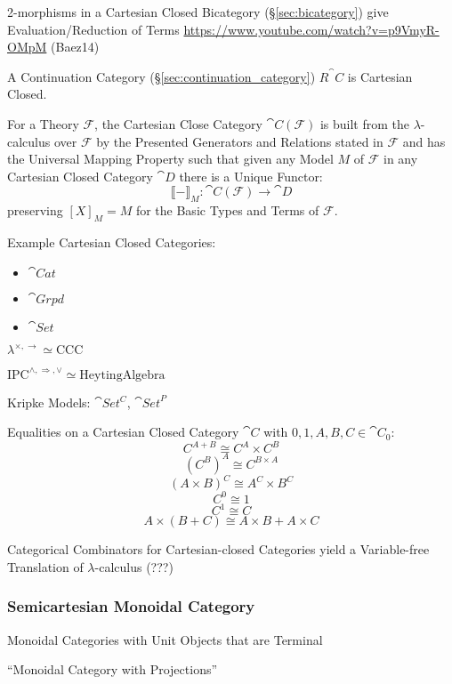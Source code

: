 2-morphisms in a Cartesian Closed Bicategory (\S\ref{sec:bicategory})
give Evaluation/Reduction of Terms
\url{https://www.youtube.com/watch?v=p9VmyR-OMpM} (Baez14)

A Continuation Category (\S\ref{sec:continuation_category})
$R^\cat{C}$ is Cartesian Closed.

For a Theory $\mathcal{F}$, the Cartesian Close Category
$\cat{C}(\mathcal{F})$ is built from the $\lambda$-calculus over
$\mathcal{F}$ by the Presented Generators and Relations stated in
$\mathcal{F}$ and has the Universal Mapping Property such that given
any Model $M$ of $\mathcal{F}$ in any Cartesian Closed Category
$\cat{D}$ there is a Unique Functor:
\[
  \llbracket - \rrbracket_M :
    \cat{C}(\mathcal{F}) \rightarrow \cat{D}
\]
preserving $[X]_M = M$ for the Basic Types and Terms of $\mathcal{F}$.
\cite{awodey06}

Example Cartesian Closed Categories:
\begin{itemize}
\item $\cat{Cat}$
\item $\cat{Grpd}$
\item $\cat{Set}$
\end{itemize}

$\lambda^{\times, \rightarrow} \simeq \mathrm{CCC}$

$\mathrm{IPC}^{\wedge, \Rightarrow, \vee} \simeq \mathrm{Heyting Algebra}$

Kripke Models: $\cat{Set^C}$, $\cat{Set}^P$ %

Equalities on a Cartesian Closed Category $\cat{C}$ with
$0,1,A,B,C \in \cat{C}_0$:
\[
  C^{A + B} \cong C^A \times C^B
\]\[
  (C^B)^A \cong C^{B \times A}
\]\[
  (A \times B)^C \cong A^C \times B^C
\]\[
  C^0 \cong 1
\]\[
  C^1 \cong C
\]\[
  A \times (B + C) \cong A \times B + A \times C
\]

Categorical Combinators for Cartesian-closed Categories yield a
Variable-free Translation of $\lambda$-calculus (???)



\subsubsection{Semicartesian Monoidal Category}
\label{sec:semicartesian_monoidal}

Monoidal Categories with Unit Objects that are Terminal

``Monoidal Category with Projections''

